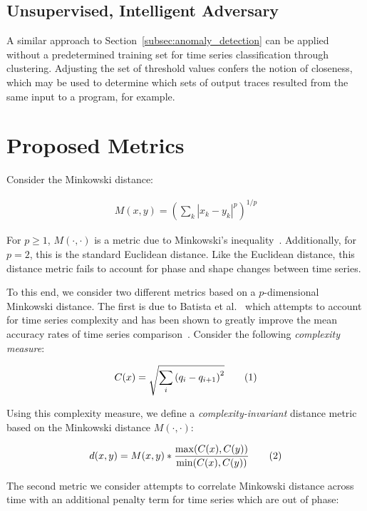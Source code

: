 \documentclass[a4paper]{article}
\newcommand\numberthis{\addtocounter{equation}{1}\tag{\theequation}}
\begin{document}
\subsection{Unsupervised, Intelligent Adversary}

A similar approach to Section~\ref{subsec:anomaly_detection} can be applied without a predetermined training set for time series classification through clustering.
Adjusting the set of threshold values confers the notion of closeness, which may be used to determine which sets of output traces resulted from the same input to a program, for example.

\section{Proposed Metrics}

Consider the Minkowski distance:

\begin{align*}
    M(x,y) = {(\sum\limits_k |x_k - y_k|^p)}^{1/p}
\end{align*}

For $p \ge 1$, $M(\cdot,\cdot)$ is a metric due to Minkowski's inequality~\cite[p. 190]{wheeden15-measure}.
Additionally, for $p = 2$, this is the standard Euclidean distance.
Like the Euclidean distance, this distance metric fails to account for phase and shape changes between time series.

To this end, we consider two different metrics based on a $p$-dimensional Minkowski distance.
The first is due to Batista et al.~\cite{batista14-cid} which attempts to account for time series complexity and has been shown to greatly improve the mean accuracy rates of time series comparison~\cite{giusti13-ecd}.
Consider the following \textit{complexity measure}:

\begin{align*}
    C(x) = \sqrt{\sum\limits_i {(q_i - q_{i+1})}^2} \numberthis
\end{align*}

Using this complexity measure, we define a \textit{complexity-invariant} distance metric based on the Minkowski distance $M(\cdot,\cdot)$:

\begin{align*}
    d(x,y) = M(x,y) * \frac{\max(C(x),C(y))}{\min(C(x),C(y))} \numberthis
\end{align*}

The second metric we consider attempts to correlate Minkowski distance across time with an additional penalty term for time series which are out of phase:
\end{document}
